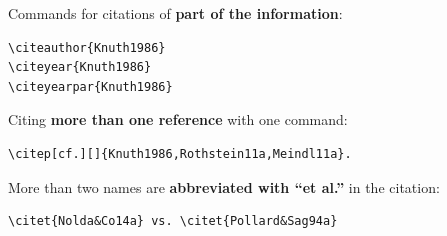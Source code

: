 \begin{frame}[fragile]
\pause 

Commands for citations of \textbf{part of the information}:


\begin{multicols}{2}
\begin{lstlisting}
\citeauthor{Knuth1986}
\citeyear{Knuth1986}
\citeyearpar{Knuth1986}
\end{lstlisting}
\citeauthor{Knuth1986}\newline
\citeyear{Knuth1986}\newline
\citeyearpar{Knuth1986}
\end{multicols}

\end{frame}


%
%
%


\begin{frame}[fragile]

Citing \textbf{more than one reference} with one command:

\begin{lstlisting}
\citep[cf.][]{Knuth1986,Rothstein11a,Meindl11a}.
\end{lstlisting}

\vspace{1em}


\pause 

More than two names are \textbf{abbreviated with ``et al.''} in the citation:

\begin{lstlisting}
\citet{Nolda&Co14a} vs. \citet{Pollard&Sag94a}
\end{lstlisting}


\end{frame}



